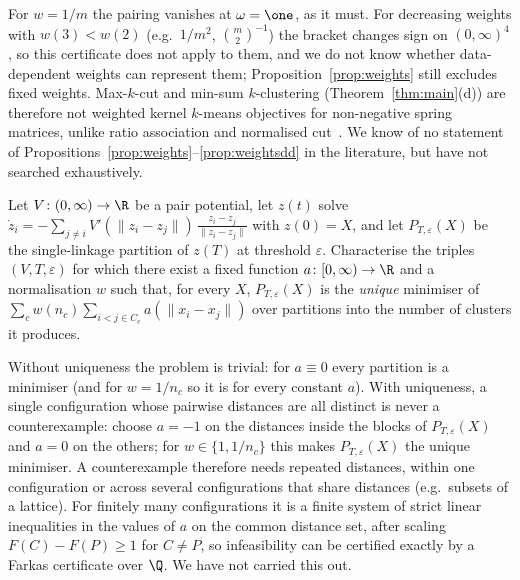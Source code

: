 \noindent For $w=1/m$ the pairing vanishes at $\omega=\one$, as it must. For decreasing weights with $w(3)<w(2)$ (e.g.\ $1/m^2$, $\binom m2^{-1}$) the bracket changes sign on $(0,\infty)^4$, so this certificate does not apply to them, and we do not know whether data-dependent weights can represent them; Proposition~\ref{prop:weights} still excludes fixed weights. Max-$k$-cut and min-sum $k$-clustering (Theorem~\ref{thm:main}(d)) are therefore not weighted kernel $k$-means objectives for non-negative spring matrices, unlike ratio association and normalised cut~\citep{dhillon2007}. We know of no statement of Propositions~\ref{prop:weights}--\ref{prop:weightsdd} in the literature, but have not searched exhaustively.

\begin{problem}\label{prob:dyn}
Let $V\colon(0,\infty)\to\R$ be a pair potential, let $z(t)$ solve $\dot z_i=-\sum_{j\ne i}V'(\lVert z_i-z_j\rVert)\,\frac{z_i-z_j}{\lVert z_i-z_j\rVert}$ with $z(0)=X$, and let $P_{T,\varepsilon}(X)$ be the single-linkage partition of $z(T)$ at threshold $\varepsilon$. Characterise the triples $(V,T,\varepsilon)$ for which there exist a fixed function $a\colon[0,\infty)\to\R$ and a normalisation $w$ such that, for every $X$, $P_{T,\varepsilon}(X)$ is the \emph{unique} minimiser of $\sum_cw(n_c)\sum_{i<j\in C_c}a(\lVert x_i-x_j\rVert)$ over partitions into the number of clusters it produces.
\end{problem}

\begin{remark}\label{rem:dyn}
Without uniqueness the problem is trivial: for $a\equiv0$ every partition is a minimiser (and for $w=1/n_c$ so it is for every constant $a$). With uniqueness, a single configuration whose pairwise distances are all distinct is never a counterexample: choose $a=-1$ on the distances inside the blocks of $P_{T,\varepsilon}(X)$ and $a=0$ on the others; for $w\in\{1,1/n_c\}$ this makes $P_{T,\varepsilon}(X)$ the unique minimiser. A counterexample therefore needs repeated distances, within one configuration or across several configurations that share distances (e.g.\ subsets of a lattice). For finitely many configurations it is a finite system of strict linear inequalities in the values of $a$ on the common distance set, after scaling $F(C)-F(P)\ge1$ for $C\ne P$, so infeasibility can be certified exactly by a Farkas certificate over $\Q$. We have not carried this out.
\end{remark}
